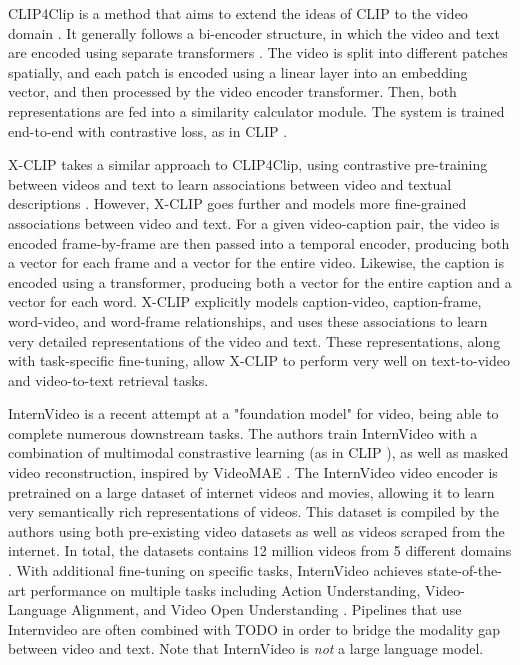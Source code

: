 \documentclass{article}
\begin{document}
CLIP4Clip is a method that aims to extend the ideas of CLIP \cite{clip} to the video domain \cite{clip4clip}.
It generally follows a bi-encoder structure, in which the video and text are encoded using separate transformers \cite{transformer}.
The video is split into different patches spatially, and each patch is encoded using a linear layer into an embedding vector, and then processed by the video encoder transformer.
Then, both representations are fed into a similarity calculator module.
The system is trained end-to-end with contrastive loss, as in CLIP \cite{clip}.

X-CLIP takes a similar approach to CLIP4Clip, using contrastive pre-training between videos and text to learn associations between video and textual descriptions \cite{xclip}.
However, X-CLIP goes further and models more fine-grained associations between video and text.
For a given video-caption pair, the video is encoded frame-by-frame are then passed into a temporal encoder, producing both a vector for each frame and a vector for the entire video.
Likewise, the caption is encoded using a transformer, producing both a vector for the entire caption and a vector for each word.
X-CLIP explicitly models caption-video, caption-frame, word-video, and word-frame relationships, and uses these associations to learn very detailed representations of the video and text.
These representations, along with task-specific fine-tuning, allow X-CLIP to perform very well on text-to-video and video-to-text retrieval tasks.

InternVideo is a recent attempt at a "foundation model" for video, being able to complete numerous downstream tasks.
The authors train InternVideo with a combination of multimodal constrastive learning (as in CLIP \cite{clip}), as well as masked video reconstruction, inspired by VideoMAE \cite{videomae}.
The InternVideo video encoder is pretrained on a large dataset of internet videos and movies, allowing it to learn very semantically rich representations of videos.
This dataset is compiled by the authors using both pre-existing video datasets as well as videos scraped from the internet. In total, the datasets contains 12 million videos from 5 different domains \cite{internvideo}.
With additional fine-tuning on specific tasks, InternVideo achieves state-of-the-art performance on multiple tasks including Action Understanding, Video-Language Alignment, and Video Open Understanding \cite{internvideo}.
Pipelines that use Internvideo are often combined with TODO in order to bridge the modality gap between video and text. Note that InternVideo is \textit{not} a large language model.
\end{document}
